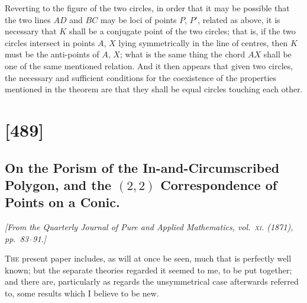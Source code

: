 \documentclass[11pt,a4paper]{article}
\theoremstyle{plain}
\theoremstyle{definition}
\begin{document}
Reverting to the figure of the two circles, in order that it may be possible that
the two lines $AD$ and $BC$ may be loci of points $P$, $P'$, related as above, it is necessary
that $K$ shall be a conjugate point of the two circles; that is, if the two circles intersect in points $A$, $X$ lying symmetrically in the line of centres, then $K$ must be the
anti-points of $A$, $X$; what is the same thing the chord $AX$ shall be one of the same
mentioned relation.  And it then appears that given two circles, the necessary and
sufficient conditions for the coexistence of the properties mentioned in the theorem are
that they shall be equal circles touching each other.

\clearpage

\section{[489]}
\subsection{On the Porism of the In-and-Circumscribed Polygon, and the $(2,2)$ Correspondence of Points on a Conic.}

\begin{center}
\textit{[From the Quarterly Journal of Pure and Applied Mathematics, vol.~\textsc{xi}. (1871), pp.~83--91.]}
\end{center}

\textsc{The} present paper includes, as will at once be seen, much that is perfectly well
known; but the separate theories regarded it seemed to me, to be put together; and
there are, particularly as regards the unsymmetrical case afterwards referred to, some results which I believe to be new.
\end{document}
